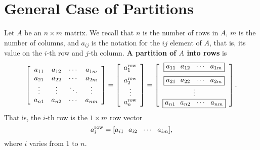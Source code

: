 \section{General Case of Partitions}
Let $A$ be an $n \times m$ matrix. We recall that $n$ is the number of rows in $A$, $m$ is the number of columns, and $a_{ij}$ is the notation for the $ij$ element of $A$, that is, its value on the $i$-th row and $j$-th column. \textbf{A partition of $A$ into rows} is $$
 \left[\begin{array}{cccc} a_{11}& a_{12}& \cdots & a_{1m} \\
 a_{21}& a_{22}& \cdots & a_{2m}  \\
 \vdots & \vdots&  \ddots & \vdots \\
 a_{n1}& a_{n2}& \cdots & a_{nm} 
 \end{array}\right] = 
\left[\begin{array}{c} a_1^{\rm row} \medskip\\
a_2^{\rm row} \\
\vdots \\
a_n^{\rm row}\end{array}\right]  = \left[\begin{array}{c}\boxed{a_{11}~~ a_{12}~~ \cdots~~ a_{1m}} \medskip \\
\boxed{a_{21}~~ a_{22}~~ \cdots~~ a_{2m}} \\
\vdots \\
\boxed{a_{n1}~~ a_{n2}~~ \cdots~~ a_{nm}}\end{array}\right].$$
That is, the $i$-th row is the $1 \times m$ row vector
$$a_i^{\rm row} =[a_{i1}~~ a_{i2}~~ \cdots~~ a_{im}], $$
where $i$ varies from $1$ to $n$.\\

